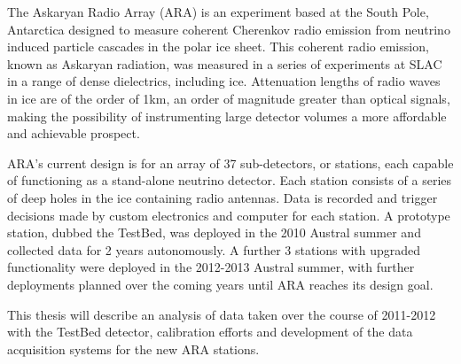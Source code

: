 The Askaryan Radio Array (ARA) is an experiment based at the South Pole, Antarctica designed to measure coherent Cherenkov radio emission from neutrino induced particle cascades in the polar ice sheet. This coherent radio emission, known as Askaryan radiation, was measured in a series of experiments at SLAC in a range of dense dielectrics, including ice. Attenuation lengths of radio waves in ice are of the order of 1km, an order of magnitude greater than optical signals, making the possibility of instrumenting large detector volumes a more affordable and achievable prospect.

ARA's current design is for an array of 37 sub-detectors, or stations, each capable of functioning as a stand-alone neutrino detector. Each station consists of a series of deep holes in the ice containing radio antennas. Data is recorded and trigger decisions made by custom electronics and computer for each station. A prototype station, dubbed the TestBed, was deployed in the 2010 Austral summer and collected data for 2 years autonomously. A further 3 stations with upgraded functionality were deployed in the 2012-2013 Austral summer, with further deployments planned over the coming years until ARA reaches its design goal.

This thesis will describe an analysis of data taken over the course of 2011-2012 with the TestBed detector, calibration efforts and development of the data acquisition systems for the new ARA stations.
